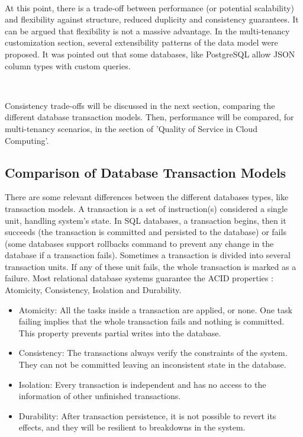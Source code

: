 \documentclass[12pt,english]{article} %
\begin{document}
\

At this point, there is a trade-off between performance (or potential scalability) and flexibility against structure, reduced duplicity and consistency guarantees.
It can be argued that flexibility is not a massive advantage.
In the multi-tenancy customization section, several extensibility patterns of the data model were proposed.
It was pointed out that some databases, like PostgreSQL allow JSON column types with custom queries.

\

Consistency trade-offs will be discussed in the next section, comparing the different database transaction models.
Then, performance will be compared, for multi-tenancy scenarios, in the section of 'Quality of Service in Cloud Computing'.


\subsection{Comparison of Database Transaction Models}
There are some relevant differences between the different databases types, like transaction models.
A transaction is a set of instruction(s) considered a single unit, handling system's state.
In SQL databases, a transaction begins, then it succeeds (the transaction is committed and persisted to the database) or fails (some databases support rollbacks command to prevent any change in the database if a transaction fails).
Sometimes a transaction is divided into several transaction units.
If any of these unit fails, the whole transaction is marked as a failure.
Most relational database systems guarantee the ACID properties \cite{acid-base-database-transaction-processing}: Atomicity, Consistency, Isolation and Durability.

\begin{itemize}
    \item Atomicity: All the tasks inside a transaction are applied, or none.
    One task failing implies that the whole transaction fails and nothing is committed.
    This property prevents partial writes into the database.
    \item Consistency: The transactions always verify the constraints of the system.
    They can not be committed leaving an inconsistent state in the database.
    \item Isolation: Every transaction is independent and has no access to the information of other unfinished transactions.
    \item Durability: After transaction persistence, it is not possible to revert its effects, and they will be resilient to breakdowns in the system.
\end{itemize}
\end{document}
